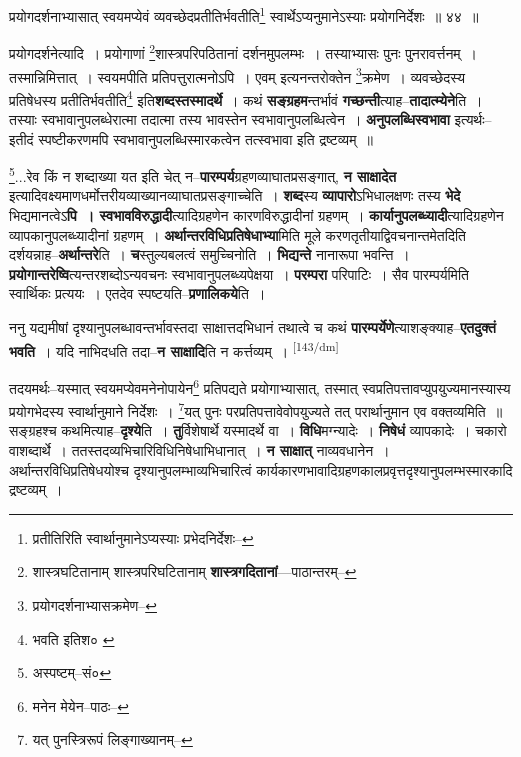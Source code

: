 \documentclass[article,12pt,a4paper]{memoir}
\begin{document}
	प्रयोगदर्शनाभ्यासात् स्वयमप्येवं व्यवच्छेदप्रतीतिर्भवतीति\footnote{प्रतीतिरिति स्वार्थानुमानेऽप्यस्याः प्रभेदनिर्देशः--\cite{dp-msC}} स्वार्थेऽप्यनुमानेऽस्याः प्रयोगनिर्देशः ॥ ४४ ॥ 
	  
	प्रयोगदर्शनेत्यादि । प्रयोगाणां \footnote{शास्त्रघटितानाम् \cite{dp-msA} \cite{dp-edP} \cite{dp-edH} \cite{dp-edE} \cite{dp-edN} शास्त्रपरिघटितानाम् \cite{dp-msB} \textbf{शास्त्रगदितानां}—पाठान्तरम्--\cite{dp-msD-n}}शास्त्रपरिपठितानां दर्शनमुपलम्भः । तस्याभ्यासः पुनः पुनरावर्त्तनम् । तस्मान्निमित्तात् । स्वयमपीति प्रतिपत्तुरात्मनोऽपि । एवम् इत्यनन्तरोक्तेन \footnote{प्रयोगदर्शनाभ्यासक्रमेण--\cite{dp-msD-n}}क्रमेण । व्यवच्छेदस्य प्रतिषेधस्य प्रतीतिर्भवतीति\footnote{भवति इतिश० \cite{dp-msC} \cite{dp-msB}} इति\textbf{शब्दस्तस्मादर्थे} । कथं \textbf{सङ्ग्रहम}न्तर्भावं \textbf{गच्छन्ती}त्याह--\textbf{तादात्म्येने}ति । तस्याः स्वभावानुपलब्धेरात्मा तदात्मा तस्य भावस्तेन स्वभावानुपलब्धित्वेन । \textbf{अनुपलब्धिस्वभावा} इत्यर्थः--इतीदं स्पष्टीकरणमपि स्वभावानुपलब्धिस्मारकत्वेन तत्स्वभावा इति द्रष्टव्यम् ॥
	\pend
      

	  \pstart \footnote{अस्पष्टम्--सं०}...रेव किं न शब्दाख्या यत इति चेत् न--\textbf{पारम्पर्य}ग्रहणव्याघातप्रसङ्गात्, \textbf{न साक्षादेत} इत्यादिवक्ष्यमाणधर्मोत्तरीयव्याख्यानव्याघातप्रसङ्गाच्चेति । \textbf{शब्द}स्य \textbf{व्यापारो}ऽभिधालक्षणः तस्य \textbf{भेदे} भिद्यमानत्वेऽ\textbf{पि । स्वभावविरुद्धादी}त्यादिग्रहणेन कारणविरुद्धादीनां ग्रहणम् । \textbf{कार्यानुपलब्ध्यादी}त्यादिग्रहणेन व्यापकानुपलब्ध्यादीनां ग्रहणम् । \textbf{अर्थान्तरविधिप्रतिषेधाभ्या}मिति मूले करणतृतीयाद्विवचनान्तमेतदिति दर्शयन्नाह--\textbf{अर्थान्तरे}ति । \textbf{च}स्तुल्यबलत्वं समुच्चिनोति । \textbf{भिद्यन्ते} नानारूपा भवन्ति । \textbf{प्रयोगान्तरेष्वि}त्यन्तरशब्दोऽन्यवचनः स्वभावानुपलब्ध्यपेक्षया । \textbf{परम्परा} परिपाटिः । सैव पारम्पर्यमिति स्वार्थिकः प्रत्ययः । एतदेव स्पष्टयति--\textbf{प्रणालिकये}ति ।
	\pend
      

	  \pstart ननु यद्यमीषां दृश्यानुपलब्धावन्तर्भावस्तदा साक्षात्तदभिधानं तथात्वे च कथं \textbf{पारम्पर्येणे}त्याशङ्क्याह--\textbf{एतदुक्तं भवति} । यदि नाभिदधति तदा--\textbf{न साक्षादि}ति न कर्त्तव्यम् ।  \leavevmode\textsuperscript{\rmlatinfont\tiny [143/dm]} 
	  
	तदयमर्थः--यस्मात् स्वयमप्येवमनेनोपायेन\footnote{मनेन मेयेन--पाठः--\cite{dp-msD-n}} प्रतिपद्यते प्रयोगाभ्यासात्, तस्मात् स्वप्रतिपत्तावप्युपयुज्यमानस्यास्य प्रयोगभेदस्य स्वार्थानुमाने निर्देशः । \footnote{यत् पुनस्त्रिरूपं लिङ्गाख्यानम्--\cite{dp-msD-n}}यत् पुनः परप्रतिपत्तावेवोपयुज्यते तत् परार्थानुमान एव वक्तव्यमिति ॥ सङ्ग्रहश्च कथमित्याह--\textbf{दृश्ये}ति । \textbf{तु}र्विशेषार्थे यस्मादर्थे वा । \textbf{विधि}मग्न्यादेः । \textbf{निषेधं} व्यापकादेः । चकारो वाशब्दार्थे । ततस्तदव्यभिचारिविधिनिषेधाभिधानात् । \textbf{न साक्षात्} नाव्यवधानेन । अर्थान्तरविधिप्रतिषेधयोश्च दृश्यानुपलम्भाव्यभिचारित्वं कार्यकारणभावादिग्रहणकालप्रवृत्तदृश्यानुपलम्भस्मारकादि द्रष्टव्यम् ।
	\pend
      
\end{document}
